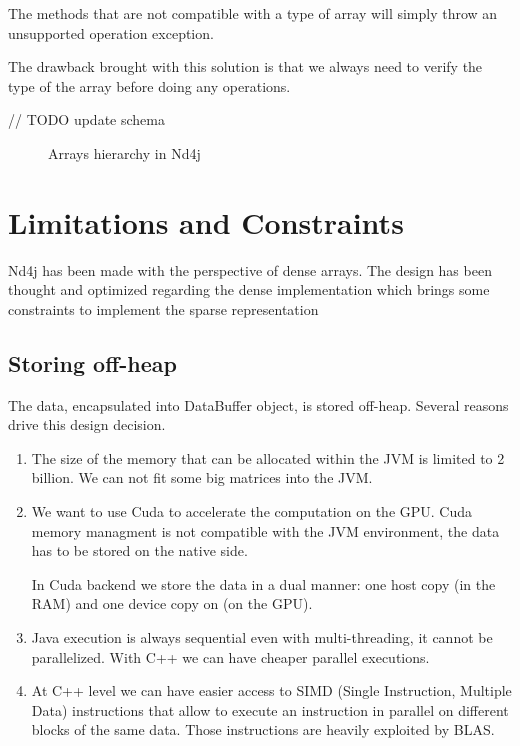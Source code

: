 The methods that are not compatible with a type of array will simply throw an unsupported operation exception.

The drawback brought with this solution is that we always need to verify the type of the array before doing any operations.

// TODO update schema
 
\begin{figure}[H]
	\begin{center}
		\label{fig:hierarchy}
		\caption{Arrays hierarchy in Nd4j}
	\end{center}
\end{figure}


\section{Limitations and Constraints}

Nd4j has been made with the perspective of dense arrays. The design has been thought and optimized regarding the dense implementation which brings some constraints to implement the sparse representation
\subsection{Storing off-heap}

The data, encapsulated into DataBuffer object, is stored off-heap. Several reasons drive this design decision.
\begin{enumerate}
	\item The size of the memory that can be allocated within the JVM is limited to 2 billion. We can not fit some big matrices into the JVM.
	\item We want to use Cuda to accelerate the computation on the GPU. Cuda memory managment is not compatible with the JVM environment, the data has to be stored on the native side.
	
	In Cuda backend we store the data in a dual manner: one host copy (in the RAM) and one device copy on (on the GPU).
	
	\item Java execution is always sequential even with multi-threading, it cannot be parallelized. With C++ we can have cheaper parallel executions.
	\item At C++ level we can have easier access to SIMD (Single Instruction, Multiple Data) instructions that allow to execute an instruction in parallel on different blocks of the same data. Those instructions are heavily exploited by BLAS.
\end{enumerate}

